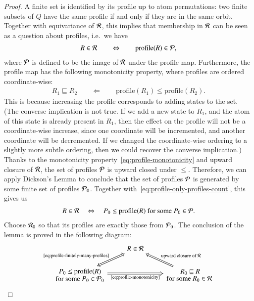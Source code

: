 \begin{proof}
    
A finite set is identified by its profile up to atom permutations: two finite subsets of $Q$ have the same profile if and only if they are in the same orbit.  Together with equivariance of ${\mathcal R}$, this implies that membership in ${\mathcal R}$ can be seen as a question about profiles, i.e.~we have 
\begin{align}
    \label{eq:profile-only-profiles-count}
R \in {\mathcal R} \qquad \Leftrightarrow \qquad \text{profile}(R) \in {\mathcal P},\end{align}
where ${\mathcal P}$ is defined to be the image of ${\mathcal R}$ under the profile map. Furthermore,  the profile map has the following monotonicity property, where profiles are ordered coordinate-wise: 
    \begin{align}
        \label{eq:profile-monotonicity}
    R_1 \sqsubseteq R_2 \qquad \Leftarrow \qquad \text{profile}(R_1) \le \text{profile}(R_2).
    \end{align}
    This is because increasing the profile corresponds to adding states to the set. (The converse implication is not true. If we add  a new state to $R_1$, and the atom of this state is already present in $R_1$, then the effect on the profile will not be a coordinate-wise increase, since one coordinate will be  incremented, and another coordinate will be decremented. If we changed the coordinate-wise ordering to a slightly more subtle ordering, then we could recover the converse implication.)
    Thanks to the monotonicity property~\eqref{eq:profile-monotonicity} and upward closure of ${\mathcal R}$,   the set of profiles ${\mathcal P}$  is upward closed under $\le$. Therefore, we can apply Dickson's Lemma to conclude that  the set of profiles ${\mathcal P}$ is generated by some finite set of profiles ${\mathcal P}_0$. Together with~\eqref{eq:profile-only-profiles-count}, this gives us
    \begin{align}
        \label{eq:profile-finitely-many-profiles}
    R \in {\mathcal R} \quad \Leftrightarrow \quad P_0 \le \text{profile}(R) \text{ for some $P_0 \in {\mathcal P}$}.
    \end{align}
    Choose ${\mathcal R}_0$ so that its profiles are exactly those from ${\mathcal P}_0$.  The conclusion of the lemma is proved in the following diagram: 
    \[
    \begin{tikzcd}
   &  R \in \Rr 
     \arrow[dr, Leftarrow,"\text{upward closure of $\Rr$ }"]
    \arrow[dl, Leftrightarrow,"\text{\eqref{eq:profile-finitely-many-profiles}}"']
    \\
 \txt{$P_0 \leq \text{profile}(R)$\\ for some $P_0 \in \Pp_0$}
    \arrow[rr, Rightarrow,"\text{\eqref{eq:profile-monotonicity}}"']
    && 
    \txt{
    $R_0 \sqsubseteq R$\\ for some $R_0 \in \Rr$}
    \end{tikzcd}
    \]
\end{proof}

